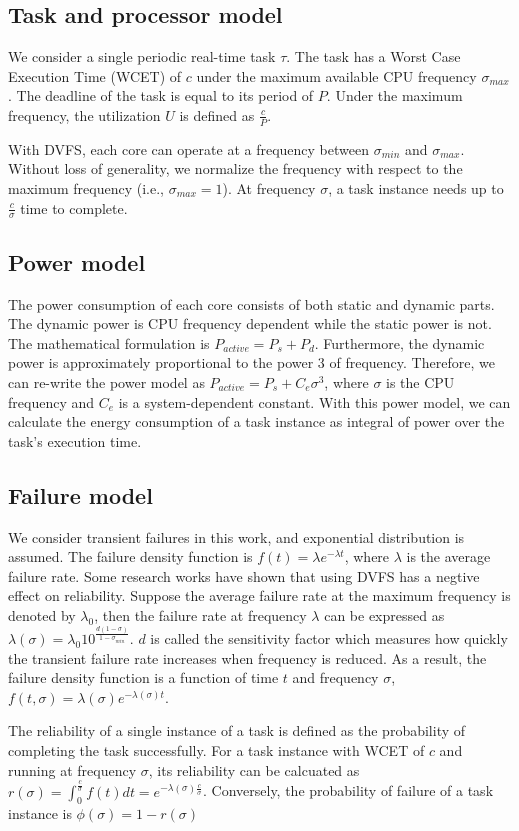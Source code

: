 \subsection{Task and processor model}
We consider a single periodic real-time task $\tau$. The task has a Worst Case Execution Time (WCET) of $c$ under the maximum available CPU frequency $\sigma_{max}$. The deadline of the task is equal to its period of $P$. Under the maximum frequency, the utilization $U$ is defined as $\frac{c}{P}$. 

With DVFS, each core can operate at a frequency between $\sigma_{min}$ and $\sigma_{max}$. 
Without loss of generality, we normalize the frequency with respect to the maximum frequency (i.e., $\sigma_{max} = 1$). At frequency $
\sigma$, a task instance needs up to $\frac{c}{\sigma}$ time to complete. 


\subsection{Power model}
The power consumption of each core consists of both static and dynamic parts. The dynamic power is CPU frequency dependent while the static power is not. The mathematical formulation is $P_{active} = P_s + P_d$. Furthermore, the dynamic power is approximately proportional to the power 3 of frequency. Therefore, we can re-write the power model as  $P_{active} = P_s + C_e \sigma^3$, where $\sigma$ is the CPU frequency and $C_e$ is a system-dependent constant. 
With this power model, we can calculate the energy consumption of a task instance as integral of power over the task's execution time. 

\subsection{Failure model}
We consider transient failures in this work, and exponential distribution is assumed. The failure density function is $f(t) = \lambda e^{-\lambda t}$, where $\lambda$ is the average failure rate. Some research works have shown that using DVFS has a negtive effect on reliability. Suppose the average failure rate at the maximum frequency is denoted by $\lambda_0$, then the failure rate at frequency $\lambda$ can be expressed as $\lambda(\sigma) = \lambda_0 10^{\frac{d(1-\sigma)}{1-\sigma_{min}}}$. $d$ is called the sensitivity factor which measures how quickly the transient failure rate increases when frequency is reduced. 
As a result, the failure density function is a function of time $t$ and frequency $\sigma$, $f(t, \sigma) = \lambda(\sigma) e^{-\lambda(\sigma)t}$.


The reliability of a single instance of a task is defined as the probability of completing the task successfully. For a task instance with WCET of $c$ and running at frequency $\sigma$, its reliability can be calcuated as $r(\sigma) = \int_0^{\frac{c}{\sigma}} f(t)dt=e^{-\lambda(\sigma)\frac{c}{\sigma}}$.
Conversely, the probability of failure of a task instance is $\phi(\sigma) = 1 - r(\sigma)$


